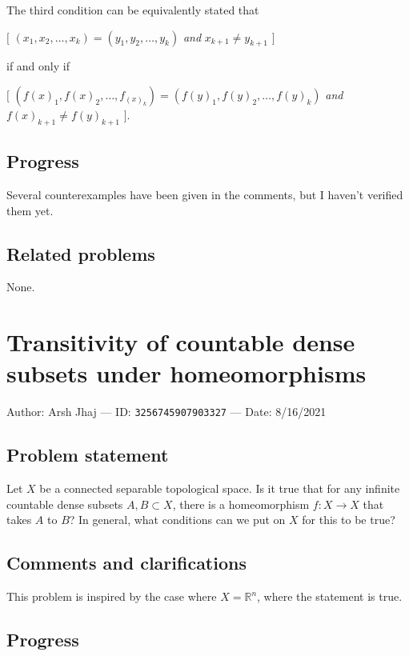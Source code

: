 \documentclass[10pt]{article}
\begin{document}
The third condition can be equivalently stated that

\BlankLine

$\Big[$ $(x_1,x_2,\ldots,x_k)=(y_1,y_2,\ldots,y_k)$ \textit{and} $x_{k+1}\neq y_{k+1}$ $\Big]$

\BlankLine

if and only if

\BlankLine

$\Big[$ $(f(x)_1,f(x)_2,\ldots,f_(x)_k)=(f(y)_1,f(y)_2,\ldots,f(y)_k)$ \textit{and} $f(x)_{k+1}\neq f(y)_{k+1}$ $\Big]$.

\subsection{Progress}

Several counterexamples have been given in the comments, but I haven't verified them yet.

\subsection{Related problems}

None.

\pagebreak

\section{Transitivity of countable dense subsets under homeomorphisms}

Author: Arsh Jhaj --- ID: \verb`3256745907903327` --- Date: 8/16/2021

\subsection{Problem statement}

Let $X$ be a connected separable topological space. Is it true that for any infinite countable dense subsets $A,B\subset X$, there is a homeomorphism $f:X\to X$ that takes $A$ to $B$? In general, what conditions can we put on $X$ for this to be true?

\subsection{Comments and clarifications}

This problem is inspired by the case where $X=\mathbb{R}^n$, where the statement is true.

\subsection{Progress}
\end{document}
